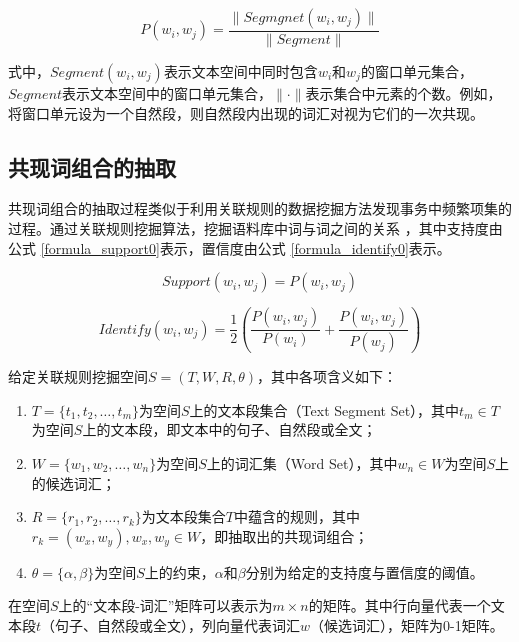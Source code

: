 \begin{equation}
P(w_i, w_j) = \frac{\parallel Segmgnet(w_i, w_j) \parallel}{\parallel Segment \parallel}
\label{formula2}
\end{equation}

式中，\(Segment(w_i, w_j)\)表示文本空间中同时包含\(w_i\)和\(w_j\)的窗口单元集合，\(Segment\)表示文本空间中的窗口单元集合，\(\parallel \cdot \parallel\)表示集合中元素的个数。例如，将窗口单元设为一个自然段，则自然段内出现的词汇对视为它们的一次共现。

\subsection{共现词组合的抽取}\label{ux5171ux73b0ux8bcdux7ec4ux5408ux7684ux62bdux53d6}

共现词组合的抽取过程类似于利用关联规则的数据挖掘方法发现事务中频繁项集的过程。通过关联规则挖掘算法，挖掘语料库中词与词之间的关系
，其中支持度由公式 \ref{formula_support0}表示，置信度由公式
\ref{formula_identify0}表示。

\begin{equation}
Support(w_i, w_j) = P(w_i, w_j)
\label{formula_support0}
\end{equation}

\begin{equation}
Identify(w_i, w_j) = \frac{1}{2}\left( \frac{P(w_i, w_j)}{P(w_i)} + \frac{P(w_i, w_j)}{P(w_j)} \right)
\label{formula_identify0}
\end{equation}

给定关联规则挖掘空间\(S = (T, W, R, \theta)\)，其中各项含义如下：

\begin{enumerate}
\def\labelenumi{\arabic{enumi}.}
\tightlist
\item
  \(T=\{t_1, t_2, \ldots, t_m\}\)为空间\(S\)上的文本段集合（Text Segment
  Set），其中\(t_m \in T\)为空间\(S\)上的文本段，即文本中的句子、自然段或全文；
\item
  \(W=\{ w_1, w_2, \ldots, w_n \}\)为空间\(S\)上的词汇集（Word
  Set），其中\(w_n \in W\)为空间\(S\)上的候选词汇；
\item
  \(R=\{ r_1, r_2, \ldots, r_k \}\)为文本段集合\(T\)中蕴含的规则，其中\(r_k=(w_x, w_y), w_x, w_y \in W\)，即抽取出的共现词组合；
\item
  \(\theta=\{ \alpha, \beta \}\)为空间\(S\)上的约束，\(\alpha\)和\(\beta\)分别为给定的支持度与置信度的阈值。
\end{enumerate}

在空间\(S\)上的``文本段-词汇''矩阵可以表示为\(m \times n\)的矩阵。其中行向量代表一个文本段\(t\)（句子、自然段或全文），列向量代表词汇\(w\)（候选词汇），矩阵为0-1矩阵。

